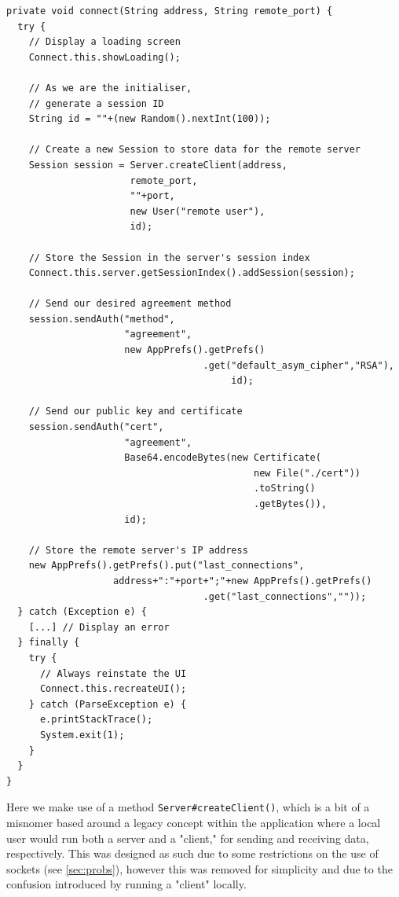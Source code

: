    \begin{lstlisting}
private void connect(String address, String remote_port) {
  try {
    // Display a loading screen
    Connect.this.showLoading();
    
    // As we are the initialiser,
    // generate a session ID
    String id = ""+(new Random().nextInt(100));
    
    // Create a new Session to store data for the remote server
    Session session = Server.createClient(address,
                      remote_port,
                      ""+port,
                      new User("remote user"),
                      id);
                      
    // Store the Session in the server's session index
    Connect.this.server.getSessionIndex().addSession(session);

    // Send our desired agreement method
    session.sendAuth("method",
                     "agreement",
                     new AppPrefs().getPrefs()
                                   .get("default_asym_cipher","RSA"),
                                        id);
                                        
    // Send our public key and certificate
    session.sendAuth("cert",
                     "agreement",
                     Base64.encodeBytes(new Certificate(
                                            new File("./cert"))
                                            .toString()
                                            .getBytes()),
                     id);
    
    // Store the remote server's IP address
    new AppPrefs().getPrefs().put("last_connections",
                   address+":"+port+";"+new AppPrefs().getPrefs()
                                   .get("last_connections",""));
  } catch (Exception e) {
    [...] // Display an error
  } finally {
    try {
      // Always reinstate the UI
      Connect.this.recreateUI();
    } catch (ParseException e) {
      e.printStackTrace();
      System.exit(1);
    }
  }
}
\end{lstlisting}
    
    Here we make use of a method \verb!Server#createClient()!, which is a bit of a misnomer based around a legacy concept within the application where a local user would run both a server and a "client," for sending and receiving data, respectively. This was designed as such due to some restrictions on the use of sockets (see \textsection\ref{sec:probs}), however this was removed for simplicity and due to the confusion introduced by running a "client" locally.
    
